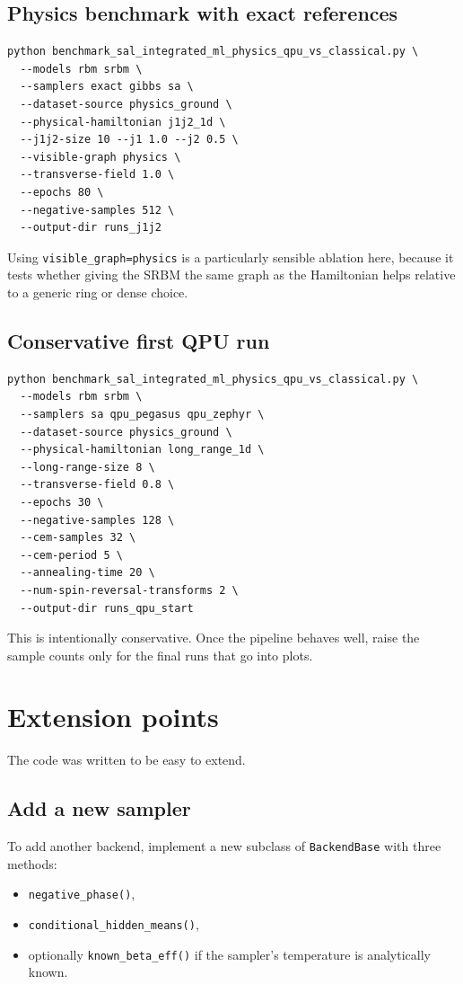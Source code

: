 \documentclass[11pt]{article}
\begin{document}
\subsection{Physics benchmark with exact references}

\begin{lstlisting}[style=code]
python benchmark_sal_integrated_ml_physics_qpu_vs_classical.py \
  --models rbm srbm \
  --samplers exact gibbs sa \
  --dataset-source physics_ground \
  --physical-hamiltonian j1j2_1d \
  --j1j2-size 10 --j1 1.0 --j2 0.5 \
  --visible-graph physics \
  --transverse-field 1.0 \
  --epochs 80 \
  --negative-samples 512 \
  --output-dir runs_j1j2
\end{lstlisting}

Using \texttt{visible\_graph=physics} is a particularly sensible ablation here,
because it tests whether giving the SRBM the same graph as the Hamiltonian helps
relative to a generic ring or dense choice.

\subsection{Conservative first QPU run}

\begin{lstlisting}[style=code]
python benchmark_sal_integrated_ml_physics_qpu_vs_classical.py \
  --models rbm srbm \
  --samplers sa qpu_pegasus qpu_zephyr \
  --dataset-source physics_ground \
  --physical-hamiltonian long_range_1d \
  --long-range-size 8 \
  --transverse-field 0.8 \
  --epochs 30 \
  --negative-samples 128 \
  --cem-samples 32 \
  --cem-period 5 \
  --annealing-time 20 \
  --num-spin-reversal-transforms 2 \
  --output-dir runs_qpu_start
\end{lstlisting}

This is intentionally conservative. Once the pipeline behaves well, raise the
sample counts only for the final runs that go into plots.

\section{Extension points}

The code was written to be easy to extend.

\subsection{Add a new sampler}

To add another backend, implement a new subclass of \texttt{BackendBase} with
three methods:
\begin{itemize}
  \item \texttt{negative\_phase()},
  \item \texttt{conditional\_hidden\_means()},
  \item optionally \texttt{known\_beta\_eff()} if the sampler's temperature is
  analytically known.
\end{itemize}
\end{document}
